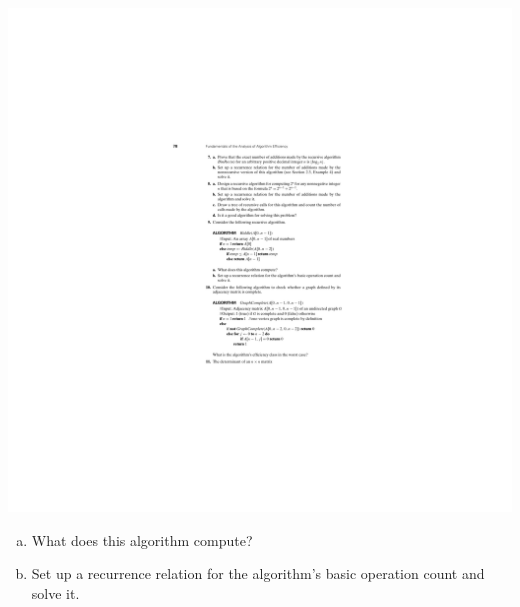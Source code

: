 \documentclass[12pt]{article}
\begin{document}
\includegraphics{w03-alg-riddle.pdf}

\begin{enumerate}[a.]
    \item What does this algorithm compute?
    \item Set up a recurrence relation for the algorithm's basic operation count and
    solve it.
\end{enumerate}
\end{document}
